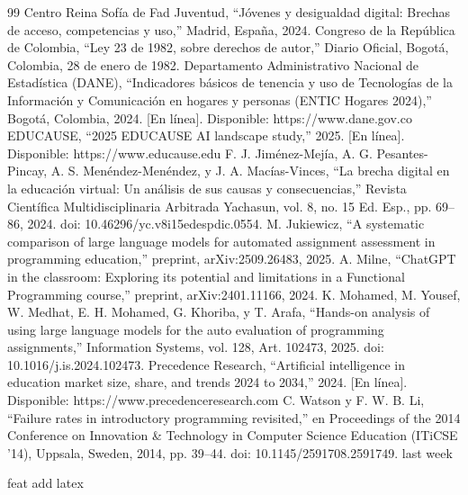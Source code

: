 \documentclass[letterpaper, 10 pt, conference]{ieeeconf}
\begin{document}
\begin{thebibliography}{99}
 Centro Reina Sofía de Fad Juventud, “Jóvenes y desigualdad digital: Brechas de acceso, competencias y uso,” Madrid, España, 2024.
 Congreso de la República de Colombia, “Ley 23 de 1982, sobre derechos de autor,” Diario Oficial, Bogotá, Colombia, 28 de enero de 1982.
 Departamento Administrativo Nacional de Estadística (DANE), “Indicadores básicos de tenencia y uso de Tecnologías de la Información y Comunicación en hogares y personas (ENTIC Hogares 2024),” Bogotá, Colombia, 2024. [En línea]. Disponible: https://www.dane.gov.co
 EDUCAUSE, “2025 EDUCAUSE AI landscape study,” 2025. [En línea]. Disponible: https://www.educause.edu
 F. J. Jiménez-Mejía, A. G. Pesantes-Pincay, A. S. Menéndez-Menéndez, y J. A. Macías-Vinces, “La brecha digital en la educación virtual: Un análisis de sus causas y consecuencias,” Revista Científica Multidisciplinaria Arbitrada Yachasun, vol. 8, no. 15 Ed. Esp., pp. 69–86, 2024. doi: 10.46296/yc.v8i15edespdic.0554.
 M. Jukiewicz, “A systematic comparison of large language models for automated assignment assessment in programming education,” preprint, arXiv:2509.26483, 2025.
 A. Milne, “ChatGPT in the classroom: Exploring its potential and limitations in a Functional Programming course,” preprint, arXiv:2401.11166, 2024.
 K. Mohamed, M. Yousef, W. Medhat, E. H. Mohamed, G. Khoriba, y T. Arafa, “Hands-on analysis of using large language models for the auto evaluation of programming assignments,” Information Systems, vol. 128, Art. 102473, 2025. doi: 10.1016/j.is.2024.102473.
 Precedence Research, “Artificial intelligence in education market size, share, and trends 2024 to 2034,” 2024. [En línea]. Disponible: https://www.precedenceresearch.com
 C. Watson y F. W. B. Li, “Failure rates in introductory programming revisited,” en Proceedings of the 2014 Conference on Innovation \& Technology in Computer Science Education (ITiCSE '14), Uppsala, Sweden, 2014, pp. 39–44. doi: 10.1145/2591708.2591749.
last week

feat add latex
\end{thebibliography}
\end{document}
